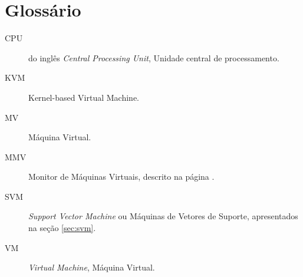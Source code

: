 %
%
\chapter{Glossário}

\begin{description}
\item[CPU] do inglês \emph{Central Processing Unit}, Unidade central de processamento.
\item[KVM] Kernel-based Virtual Machine.
\item[MV] Máquina Virtual.
\item[MMV] Monitor de Máquinas Virtuais, descrito na página \pageref{sec:virt}.
\item[SVM] \emph{Support Vector Machine} ou Máquinas de Vetores
de Suporte, apresentados na seção \ref{sec:svm}.
\item[VM] \emph{Virtual Machine}, Máquina Virtual.
\end{description}
